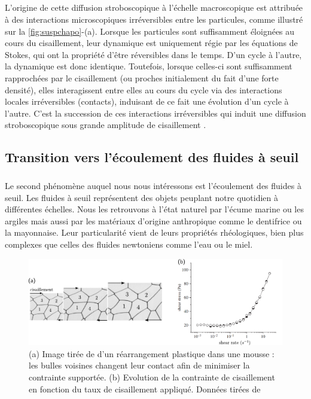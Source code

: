 \subparagraph{}L'origine de cette diffusion stroboscopique à l'échelle macroscopique est attribuée à des interactions microscopiques irréversibles entre les particules, comme illustré sur la \autoref{fig:suspchapo}-(a). Lorsque les particules sont suffisamment éloignées au cours du cisaillement, leur dynamique est uniquement régie par les équations de Stokes, qui ont la propriété d'être réversibles dans le temps. D'un cycle à l'autre, la dynamique est donc identique. Toutefois, lorsque celles-ci sont suffisamment rapprochées par le cisaillement (ou proches initialement du fait d'une forte densité), elles interagissent entre elles au cours du cycle via des interactions locales irréversibles (contacts), induisant de ce fait une évolution d'un cycle à l'autre. C'est la succession de ces interactions irréversibles qui induit une diffusion stroboscopique sous grande amplitude de cisaillement \cite{corte_random_2008}.

\subsection{Transition vers l'écoulement des fluides à seuil}

\subparagraph{}Le second phénomène auquel nous nous intéressons est l'écoulement des fluides à seuil. Les fluides à seuil représentent des objets peuplant notre quotidien à différentes échelles. Nous les retrouvons à l'état naturel par l'écume marine ou les argiles mais aussi par les matériaux d'origine anthropique comme le dentifrice ou la mayonnaise. Leur particularité vient de leurs propriétés rhéologiques, bien plus complexes que celles des fluides newtoniens comme l'eau ou le miel.

\begin{figure}[h]
	\centering
	\includegraphics[width=\textwidth]{Chapitre1/Figures/Chapo/yielding.pdf}
	\caption{(a) Image tirée de \cite{dollet_rheology_2014} d'un réarrangement plastique dans une mousse : les bulles voisines changent leur contact afin de minimiser la contrainte supportée. (b) Evolution de la contrainte de cisaillement en fonction du taux de cisaillement appliqué. Données tirées de \cite{moller_origin_2009}}
	\label{fig:yieldingchapo}
\end{figure}


